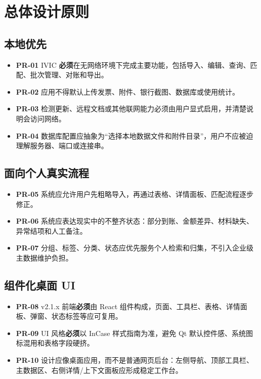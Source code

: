 \documentclass[UTF8,zihao=-4]{ctexart}
\newcommand{\req}[1]{\textbf{\textcolor{ivicBrown}{#1}}}
\newcommand{\must}{\textbf{必须}}
\begin{document}
\section{总体设计原则}

\subsection{本地优先}

\begin{itemize}
  \item \req{PR-01} IVIC \must{}在无网络环境下完成主要功能，包括导入、编辑、查询、匹配、批次管理、对账和导出。
  \item \req{PR-02} 应用不得默认上传发票、附件、银行截图、数据库或使用统计。
  \item \req{PR-03} 检测更新、远程文档或其他联网能力必须由用户显式启用，并清楚说明会访问网络。
  \item \req{PR-04} 数据库配置应抽象为“选择本地数据文件和附件目录”，用户不应被迫理解服务器、端口或连接串。
\end{itemize}

\subsection{面向个人真实流程}

\begin{itemize}
  \item \req{PR-05} 系统应允许用户先粗略导入，再通过表格、详情面板、匹配流程逐步修正。
  \item \req{PR-06} 系统应表达现实中的不整齐状态：部分到账、金额差异、材料缺失、异常结项和人工备注。
  \item \req{PR-07} 分组、标签、分类、状态应优先服务个人检索和归集，不引入企业级主数据维护负担。
\end{itemize}

\subsection{组件化桌面 UI}

\begin{itemize}
  \item \req{PR-08} v2.1.x 前端\must{}由 React 组件构成，页面、工具栏、表格、详情面板、弹窗、状态标签等应可复用。
  \item \req{PR-09} UI 风格\must{}以 InCase 样式指南为准，避免 Qt 默认控件感、系统图标混用和表格字段硬挤。
  \item \req{PR-10} 设计应像桌面应用，而不是普通网页后台：左侧导航、顶部工具栏、主数据区、右侧详情/上下文面板应形成稳定工作台。
\end{itemize}
\end{document}
